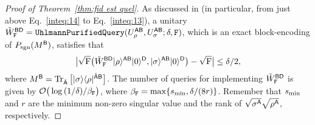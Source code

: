 \begin{proof}[Proof of Theorem~\ref{thm:fid est quel}]





As discussed in  (in particular, from just above Eq.~\eqref{inteq:14} to Eq.~\eqref{inteq:13}), a unitary $\tilde{W}_{\mathtt{F}}^{{\mathsf{B}}{\mathsf{D}}} = \mathtt{UhlmannPurifiedQuery}(U_\rho^{{\mathsf{A}}{\mathsf{B}}}, U_\sigma^{{\mathsf{A}}{\mathsf{B}}}; \delta, \mathtt{F})$, which is an exact block-encoding of $P_{\mathrm{sgn}}(M^{\mathsf{B}})$, satisfies that 
\begin{align}
\label{inteq:53}
    \big|\sqrt{{\mathrm{F}}}\big(\tilde{W}_{\mathtt{F}}^{{\mathsf{B}}{\mathsf{D}}}|\rho\rangle^{{\mathsf{A}}{\mathsf{B}}}|0\rangle^{\mathsf{D}}, |\sigma\rangle^{{\mathsf{A}}{\mathsf{B}}}|0\rangle^{\mathsf{D}}\big) - \sqrt{{\mathrm{F}}}\big| \leq \delta/2, 
\end{align}
where $M^{\mathsf{B}} = \operatorname{Tr}_{\hat{{\mathsf{A}}}}\big[|\sigma\rangle\langle\rho|^{\hat{{\mathsf{A}}}{\mathsf{B}}}\big]$.
The number of queries for implementing $\tilde{W}_{\mathtt{F}}^{{\mathsf{B}}{\mathsf{D}}}$ is given by ${\mathcal{O}}\big(\log{(1/\delta)}/\beta_{\mathtt{F}}\big)$, where $\beta_{\mathtt{F}} = \max\{s_{\rm min}, \delta/(8r)\}$.
Remember that $s_{\rm min}$ and $r$ are the minimum non-zero singular value and the rank of $\sqrt{\sigma^{\mathsf{A}}}\sqrt{\rho^{\mathsf{A}}}$, respectively.




\end{proof}
